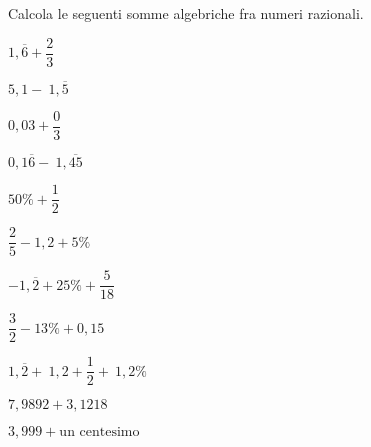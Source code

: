 \begin{esercizio}
 \label{ese:3.45}
Calcola le seguenti somme algebriche fra numeri razionali.
\begin{multicols}{3}
\begin{enumeratea}
\spazielenx
\item $1,\overline{6} +\dfrac{2}{3}$
\item $5,1 -~1,\overline{5}$
\item $0,03+ \dfrac{0}{3}$
\item $0,1\overline{6} -~1,\overline{45}$
\item $50\% + \dfrac{1}{2}$
\item $\dfrac{2}{5}-1,2+5\%~$
\item $-1,\overline{2}+25\%+\dfrac{5}{18}$
\item $\dfrac{3}{2} -13\% +0,15$
\item $1,\overline{2} +~1,2 + \dfrac{1}{2} +~1,2\%~$
\item $7,9892+3,1218$
\item $3,999+ \text{un centesimo}$
\end{enumeratea}
\end{multicols}
\end{esercizio}

